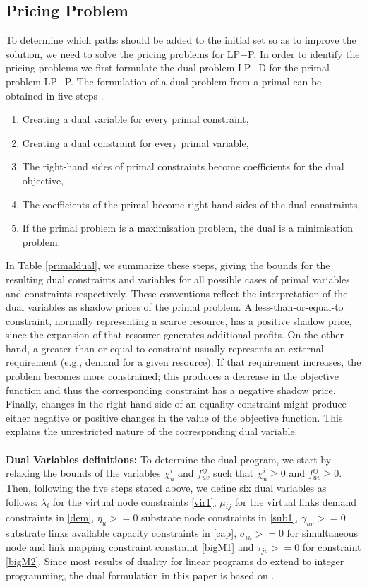 \documentclass[journal]{IEEEtran}
\begin{document}
\subsection{Pricing Problem}
To determine which paths should be added to the initial set so as to improve the solution, we need to solve the pricing problems for LP$-$P. In order to identify the pricing problems we first formulate the dual problem LP$-$D for the primal problem LP$-$P. The formulation of a dual problem from a primal can be obtained in five steps \cite{Lahaie08}.
\begin{enumerate}
\item Creating a dual variable for every primal constraint,
\item Creating a dual constraint for every primal variable,
\item The right-hand sides of primal constraints become coefficients for the dual objective,
\item The coefficients of the primal become right-hand sides of the dual constraints,
\item If the primal problem is a maximisation problem, the dual is a minimisation problem.
\end{enumerate}
In Table \ref{primaldual}, we summarize these steps, giving the bounds for the resulting dual constraints and variables for all possible cases of primal variables and constraints respectively. These conventions reflect the interpretation of the dual variables as shadow prices of the primal problem. A less-than-or-equal-to constraint, normally representing a scarce resource, has a positive shadow price, since the expansion of that resource generates additional profits. On the other hand, a greater-than-or-equal-to constraint usually represents an external requirement (e.g., demand for a given resource). If that requirement increases, the problem becomes more constrained; this produces a decrease in the objective function and thus the corresponding constraint has a negative shadow price. Finally, changes in the right hand side of an equality constraint might produce either negative or positive changes in the value of the objective function. This explains the unrestricted nature of the corresponding dual variable.\\\\
\textbf{Dual Variables definitions:}
To determine the dual program, we start by relaxing the bounds of the variables $\chi_u^i$ and $f_{uv}^{ij}$ such that $\chi_u^i \geq 0$ and $f_{uv}^{ij} \geq 0$. Then, following the five steps stated above, we define six dual variables as follows: $\lambda_i$  for the virtual node constraints \eqref{vir1}, $\mu_{ij}$ for the virtual links demand constraints in \eqref{dem}, $\eta_u >= 0$ substrate node constraints in \eqref{sub1}, $\gamma_{uv} >= 0$ substrate links available capacity constraints in \eqref{cap}, $\sigma_{iu} >= 0$ for simultaneous node and link mapping constraint constraint \eqref{bigM1} and $\tau_{jv} >= 0$ for constraint \eqref{bigM2}. Since most results of duality for linear programs do extend to integer programming\cite{Guzelsoy10}, the dual formulation in this paper is based on \cite{Lahaie08}.
\end{document}
